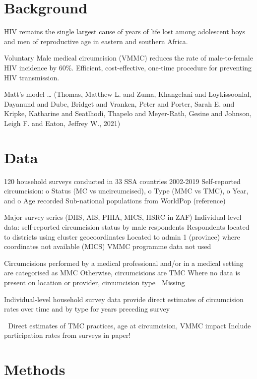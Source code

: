 \documentclass[a4paper, 12pt]{article}
\begin{document}
\newpage

\section{Background}
\label{sec:org4d6185d}

HIV remains the single largest cause of years of life lost among adolescent boys and men of reproductive age in eastern and southern Africa.

Voluntary Male medical circumcision (VMMC) reduces the rate of male-to-female HIV incidence by 60\%.
Efficient, cost-effective, one-time procedure for preventing HIV transmission.

Matt's model \ldots{} (Thomas, Matthew L. and Zuma, Khangelani and Loykissoonlal, Dayanund and Dube, Bridget and Vranken, Peter and Porter, Sarah E. and Kripke, Katharine and Seatlhodi, Thapelo and Meyer-Rath, Gesine and Johnson, Leigh F. and Eaton, Jeffrey W., 2021)

\newpage
\section{Data}
\label{sec:org04d2548}

120 household surveys conducted in 33 SSA countries 2002-2019
Self-reported circumcision:
o Status (MC vs uncircumcised), 
o Type (MMC vs TMC), 
o Year, and
o Age 
recorded
Sub-national populations from WorldPop (reference)

Major survey series (DHS, AIS, PHIA, MICS, HSRC in ZAF)
Individual-level data: self-reported circumcision status  by male respondents
Respondents located to districts using cluster geocoordinates
Located to admin 1 (province) where coordinates not available (MICS)
VMMC programme data not used

Circumcisions performed by a medical professional and/or in a medical setting are categorised as MMC
Otherwise, circumcisions are TMC
Where no data is present on location or provider, circumcision type  Missing

Individual-level household survey data provide direct estimates of circumcision rates over time and by type for years preceding survey

 Direct estimates of TMC practices, age at circumcision, VMMC impact
Include participation rates from surveys in paper!


\newpage

\section{Methods}
\label{sec:org3647916}
\end{document}

